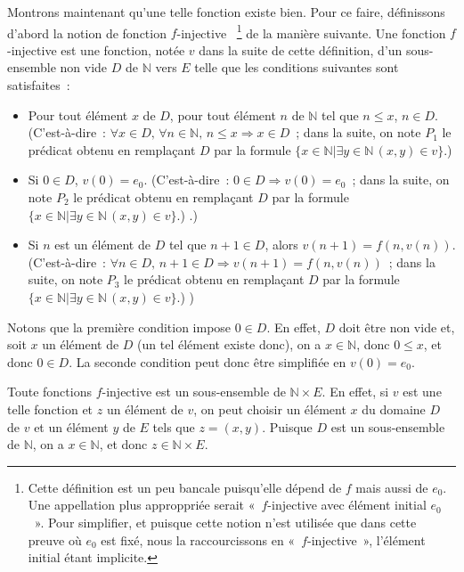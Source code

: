 Montrons maintenant qu'une telle fonction existe bien. 
Pour ce faire, définissons d'abord la notion de fonction $f$-injective%
~\footnote{
    Cette définition est un peu bancale puisqu'elle dépend de $f$ mais aussi de $e_0$. 
    Une appellation plus approppriée serait « $f$-injective avec élément initial $e_0$ ». 
    Pour simplifier, et puisque cette notion n'est utilisée que dans cette preuve où $e_0$ est fixé, nous la raccourcissons en « $f$-injective », l'élément initial étant implicite.
}
de la manière suivante. 
Une fonction $f$-injective est une fonction, notée $v$ dans la suite de cette définition, d'un sous-ensemble non vide $D$ de $\mathbb{N}$ vers $E$ telle que les conditions suivantes sont satisfaites :
\begin{itemize}[nosep]
    \item Pour tout élément $x$ de $D$, pour tout élément $n$ de $\mathbb{N}$ tel que $n \leq x$, $n \in D$. 
        (C'est-à-dire : $\forall x \in D, \, \forall n \in \mathbb{N}, \, n \leq x \Rightarrow x \in D$ ; dans la suite, on note $P_1$ le prédicat obtenu en remplaçant $D$ par la formule $\lbrace x \in \mathbb{N} \vert \exists y \in \mathbb{N} \, (x,y) \in v \rbrace$.)
    \item Si $0 \in D$, $v(0) = e_0$.
        (C'est-à-dire : $0 \in D \Rightarrow v(0) = e_0$ ; dans la suite, on note $P_2$ le prédicat obtenu en remplaçant $D$ par la formule $\lbrace x \in \mathbb{N} \vert \exists y \in \mathbb{N} \, (x,y) \in v \rbrace$.)
.)
    \item Si $n$ est un élément de $D$ tel que $n+1 \in D$, alors $v(n+1) = f(n, v(n))$. 
        (C'est-à-dire : $\forall n \in D, \, n+1 \in D \Rightarrow v(n+1) = f(n, v(n))$ ; dans la suite, on note $P_3$ le prédicat obtenu en remplaçant $D$ par la formule $\lbrace x \in \mathbb{N} \vert \exists y \in \mathbb{N} \, (x,y) \in v \rbrace$.)
)
\end{itemize}
Notons que la première condition impose $0 \in D$. 
En effet, $D$ doit être non vide et, soit $x$ un élément de $D$ (un tel élément existe donc), on a $x \in \mathbb{N}$, donc $0 \leq x$, et donc $0 \in D$. 
La seconde condition peut donc être simplifiée en $v(0) = e_0$. 

Toute fonctions $f$-injective est un sous-ensemble de $\mathbb{N} \times E$. 
En effet, si $v$ est une telle fonction et $z$ un élément de $v$, on peut choisir un élément $x$ du domaine $D$ de $v$ et un élément $y$ de $E$ tels que $z = (x,y)$.
Puisque $D$ est un sous-ensemble de $\mathbb{N}$, on a $x \in \mathbb{N}$, et donc $z \in \mathbb{N} \times E$.

